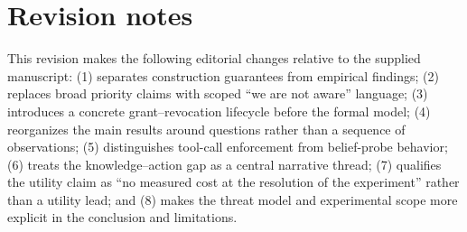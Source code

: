 \documentclass[11pt]{article}
\begin{document}
\section{Revision notes}
This revision makes the following editorial changes relative to the supplied manuscript: (1) separates construction guarantees from empirical findings; (2) replaces broad priority claims with scoped ``we are not aware'' language; (3) introduces a concrete grant--revocation lifecycle before the formal model; (4) reorganizes the main results around questions rather than a sequence of observations; (5) distinguishes tool-call enforcement from belief-probe behavior; (6) treats the knowledge--action gap as a central narrative thread; (7) qualifies the utility claim as ``no measured cost at the resolution of the experiment'' rather than a utility lead; and (8) makes the threat model and experimental scope more explicit in the conclusion and limitations.
\end{document}
